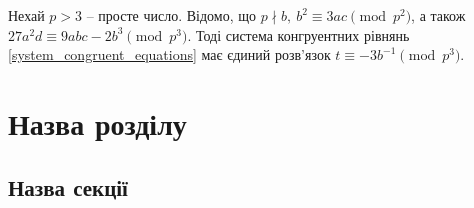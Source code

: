 \documentclass{thesis}
\begin{document}
\begin{lemma}
Нехай $p > 3$ -- просте число. Відомо, що $p \nmid b,\ b^2 \equiv 3ac \pmod {p^2}$, а також $27a^2d \equiv 9abc - 2b^3 \pmod {p^3}$. Тоді система конгруентних рівнянь \eqref{system_congruent_equations} має єдиний розв'язок $t \equiv -3 b^{-1} \pmod {p^3}$.
\end{lemma}

\iffalse
Розпишемо матриці $[\omega_1],\ [\omega_2]$ оператора множення. Для множення на $\omega_1$ маємо
\begin{align*}
\omega_1 \cdot 1 = \omega_1 = 0 \cdot 1 + 1 \cdot \omega_1 + 0 \cdot \omega_2 \\
\omega_1 \cdot \omega_1 = -ac + b \omega_1 + a \omega_2 \\
\omega_1 \cdot \omega_2 = ad = ad \cdot 1 + 0 \cdot \omega_1 + 0 \cdot \omega_2
\end{align*}
Водночас для множення на $\omega_2$ маємо
\begin{align*}
\omega_2 \cdot 1 = \omega_2 = 0 \cdot 1 + 0 \cdot \omega_1 + 1 \cdot \omega_2 \\
\omega_2 \cdot \omega_1 = ad = ad \cdot 1 + 0 \cdot \omega_1 + 0 \cdot \omega_2 \\
\omega_2 \cdot \omega_2 = -bd + d \omega_1 + c 
\end{align*}
Звідси отримуємо матриці
\begin{align*}
[\omega_1] = \begin{pmatrix}
0 & -ac & ad \\
1 & b & 0 \\
0 & a & 0
\end{pmatrix},\quad [\omega_2] = \begin{pmatrix}
0 & ad & -bd \\
0 & 0 & d \\
1 & 0 & c
\end{pmatrix}
\end{align*}
\fi

\newpage

\chapter{Назва розділу}\label{chaper2}

\section{Назва секції}\label{section2.1}


\newpage
\end{document}
